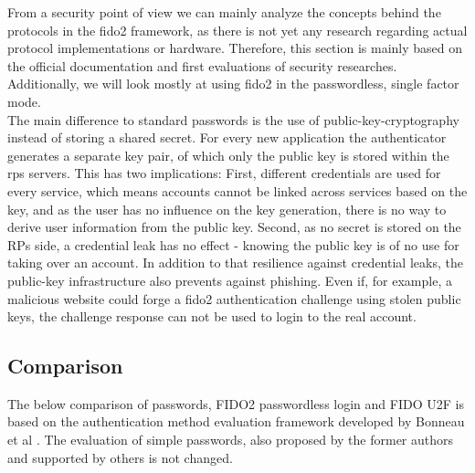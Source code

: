 From a security point of view we can mainly analyze the concepts behind the protocols in the \ac{fido2} framework, as there is not yet any research regarding actual protocol implementations or hardware. Therefore, this section is mainly based on the official documentation and first evaluations of security researches. Additionally, we will look mostly at using \ac{fido2} in the passwordless, single factor mode.\\
The main difference to standard passwords is the use of public-key-cryptography instead of storing a shared secret. For every new application the authenticator generates a separate key pair, of which only the public key is stored within the \acp{rp} servers. This has two implications: First, different credentials are used for every service, which means accounts cannot be linked across services based on the key, and as the user has no influence on the key generation, there is no way to derive user information from the public key. Second, as no secret is stored on the RPs side, a credential leak has no effect - knowing the public key is of no use for taking over an account. In addition to that resilience against credential leaks, the public-key infrastructure also prevents against phishing. Even if, for example, a malicious website could forge a \ac{fido2} authentication challenge using stolen public keys, the challenge response can not be used to login to the real account.


\subsection{Comparison}
\label{subsec:comparison}

The below comparison of passwords, FIDO2 passwordless login and FIDO U2F is based on the authentication method evaluation framework developed by Bonneau et al \cite{bonneau2012}. The evaluation of simple passwords, also proposed by the former authors and supported by others \cite{lyastani2020} is not changed.

